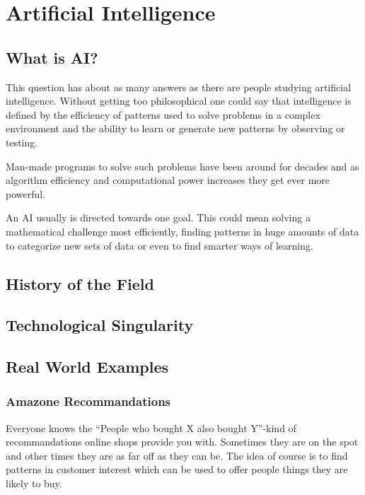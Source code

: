 \documentclass[DIV=calc, paper=a4, fontsize=11pt, twocolumn]{scrreprt}	 %
\begin{document}
        \chapter{Artificial Intelligence}
        \section{What is AI?}

        This question has about as many answers as there are people studying artificial intelligence. Without getting too philosophical one could say that intelligence is defined by the efficiency of patterns used to solve problems in a complex environment and the ability to learn or generate new patterns by observing or testing.

        Man-made programs to solve such problems have been around for decades and as algorithm efficiency and computational power increases they get ever more powerful.

        An AI usually is directed towards one goal. This could mean solving a mathematical challenge most efficiently, finding patterns in huge amounts of data to categorize new sets of data or even to find smarter ways of learning.


        \section{History of the Field}

        \section{Technological Singularity}

        \newpage
        \section{Real World Examples}

        \subsection{Amazone Recommandations}
        Everyone knows the ``People who bought X also bought Y''-kind of recommandations online shops provide you with. Sometimes they are on the spot and other times they are as far off as they can be. The idea of course is to find patterns in customer interest which can be used to offer people things they are likely to buy.
\end{document}
